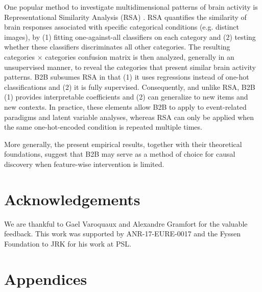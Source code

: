 \documentclass[preprint,12pt,3p]{elsarticle}
\begin{document}
One popular method to investigate multidimensional patterns of brain activity is
Representational Similarity Analysis (RSA)
\citep{kriegeskorte2008representational}. RSA quantifies the
similarity of brain responses associated with specific categorical conditions
(e.g. distinct images), by (1) fitting one-against-all classifiers on each
category and (2) testing whether these classifiers discriminates all other
categories. The resulting categories $\times$ categories confusion matrix is
then analyzed, generally in an unsupervised manner, to reveal the categories
that present similar brain activity patterns. B2B
subsumes RSA in that (1) it uses regressions instead of one-hot
classifications and (2) it is fully supervised.
Consequently, and unlike RSA, B2B (1) provides interpretable coefficients and
(2) can generalize to new items and new contexts. In practice, these elements
allow B2B to apply to event-related paradigms and latent variable analyses,
whereas RSA can only be applied when the same one-hot-encoded condition is
repeated multiple times.

More generally, the present empirical results, together with their theoretical
foundations, suggest that B2B may serve as a method of choice for causal
discovery when feature-wise intervention is limited.

\section{Acknowledgements}
We are thankful to Gael Varoquaux and Alexandre Gramfort for the valuable
feedback. This work was supported by ANR-17-EURE-0017 and the Fyssen Foundation
to JRK for his work at PSL.




\newpage
\clearpage
\section{Appendices}

\end{document}

